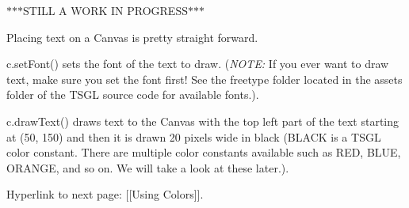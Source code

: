 $\ast$$\ast$$\ast$\+S\+T\+I\+L\+L A W\+O\+R\+K I\+N P\+R\+O\+G\+R\+E\+S\+S$\ast$$\ast$$\ast$

Placing text on a Canvas is pretty straight forward.

c.\+set\+Font() sets the font of the text to draw. ({\itshape N\+O\+T\+E\+:} If you ever want to draw text, make sure you set the font first! See the freetype folder located in the assets folder of the T\+S\+G\+L source code for available fonts.).

c.\+draw\+Text() draws text to the Canvas with the top left part of the text starting at (50, 150) and then it is drawn 20 pixels wide in black (B\+L\+A\+C\+K is a T\+S\+G\+L color constant. There are multiple color constants available such as R\+E\+D, B\+L\+U\+E, O\+R\+A\+N\+G\+E, and so on. We will take a look at these later.).

Hyperlink to next page\+: \mbox{[}\mbox{[}Using Colors\mbox{]}\mbox{]}. 
